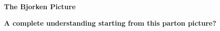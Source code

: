 \documentclass[9pt,a4paper,unknownkeysallowed,xcolor=dvipsnames,aspectratio=43]{beamer}
\begin{document}
\begin{frame}{\bf\huge The Bjorken Picture}
\begin{enumerate}
\end{enumerate}
\vspace{2mm}
\begin{center}
{\bf\large A complete understanding starting from this parton picture?}
\end{center}

\end{frame}
%
%
\end{document}
